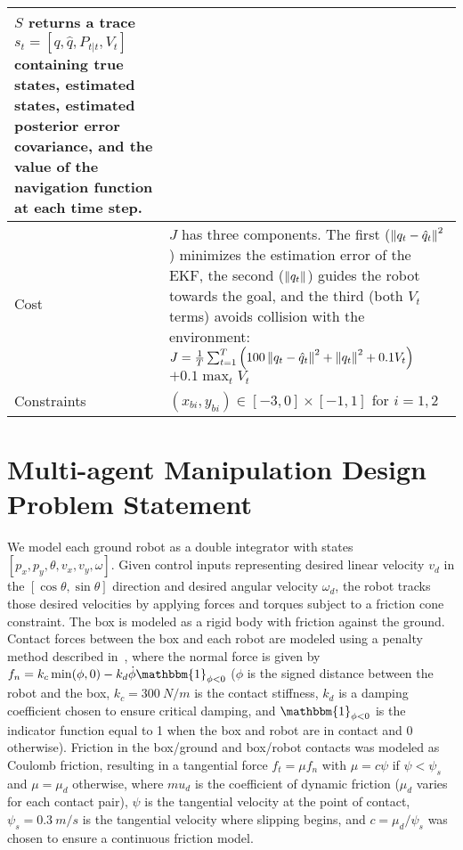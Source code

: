 \begin{table}[tb]
\begin{tabular}{|p{2.5cm}|p{14cm}|}
        $S$ returns a trace $s_t = [q, \hat{q}, P_{t|t}, V_t]$ containing true states, estimated states, estimated posterior error covariance, and the value of the navigation function at each time step.
        \\ \hline
        Cost                 & $J$ has three components. The first ($\left\lVert q_t - \hat{q}_t\right\rVert^2$) minimizes the estimation error of the EKF, the second ($\left\lVert q_t\right\rVert$) guides the robot towards the goal, and the third (both $V_t$ terms) avoids collision with the environment:
        $J = \frac{1}{T} \sum_{t=1}^T \left( 100 \left\lVert q_t - \hat{q}_t\right\rVert^2 + \left\lVert q_t\right\rVert^2 + 0.1 V_t \right)$ $+ 0.1 \max_t V_t$
        \\ \hline
        Constraints          & $(x_{bi}, y_{bi}) \in [-3, 0] \times [-1, 1]$ for $i=1, 2$                                                                                                                                                                                                                                                                                                                                                                                                                                                                                                                                     \\ \hline
    \end{tabular}
\end{table}

\section{Multi-agent Manipulation Design Problem Statement}

We model each ground robot as a double integrator with states $[p_x, p_y, \theta, v_x, v_y, \omega]$. Given control inputs representing desired linear velocity $v_d$ in the $[\cos\theta, \sin\theta]$ direction and desired angular velocity $\omega_d$, the robot tracks those desired velocities by applying forces and torques subject to a friction cone constraint. The box is modeled as a rigid body with friction against the ground. Contact forces between the box and each robot are modeled using a penalty method described in~\cite{suh2021_bundled_gradients}, where the normal force is given by $f_n = k_c \min(\phi, 0) - k_d \dot{\phi} \mathbbm{1}_{\phi < 0}$ ($\phi$ is the signed distance between the robot and the box, $k_c = \SI{300}{N/m}$ is the contact stiffness, $k_d$ is a damping coefficient chosen to ensure critical damping, and $\mathbbm{1}_{\phi < 0}$ is the indicator function equal to 1 when the box and robot are in contact and 0 otherwise). Friction in the box/ground and box/robot contacts was modeled as Coulomb friction, resulting in a tangential force $f_t = \mu f_n$ with $\mu = c\psi$ if $\psi < \psi_s$ and $\mu = \mu_d$ otherwise, where $mu_d$ is the coefficient of dynamic friction ($\mu_d$ varies for each contact pair), $\psi$ is the tangential velocity at the point of contact, $\psi_s = \SI{0.3}{m/s}$ is the tangential velocity where slipping begins, and $c = \mu_d / \psi_s$ was chosen to ensure a continuous friction model.

